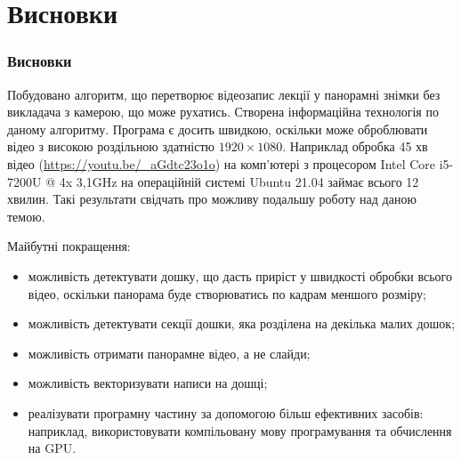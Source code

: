 \section{Висновки}
\begin{frame}
  \frametitle{Висновки}
  Побудовано алгоритм, що перетворює відеозапис лекції у панорамні знімки без викладача з камерою, що може
  рухатись. Створена інформаційна технологія по даному алгоритму. Програма є досить
  швидкою, оскільки може оброблювати відео з високою роздільною здатністю $1920 \times 1080$. 
  Наприклад обробка 45 хв відео (\url{https://youtu.be/_aGdtc23o1o}) на комп'ютері з 
  процесором Intel Core i5-7200U @ 4x 3,1GHz на операційній системі Ubuntu 21.04 займає
  всього 12 хвилин. Такі результати свідчать про можливу подальшу роботу над даною темою.

  Майбутні покращення:
  \begin{itemize}
    \item можливість детектувати дошку, що дасть приріст у швидкості обробки
          всього відео, оскільки панорама буде створюватись по кадрам меншого розміру;
    \item можливість детектувати секції дошки, яка розділена на декілька малих дошок;
    \item можливість отримати панорамне відео, а не слайди;
    \item можливість векторизувати написи на дошці;
    \item реалізувати програмну частину за допомогою більш ефективних засобів:
          наприклад, використовувати компільовану мову програмування
          та обчислення на GPU.
  \end{itemize}
\end{frame}
